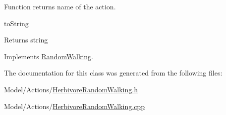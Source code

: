 Function returns name of the action. 

to\+String \begin{DoxyReturn}{Returns}
string 
\end{DoxyReturn}


Implements \hyperlink{class_random_walking_a86f089cc5cc28d179e248c67477e8b30}{Random\+Walking}.



The documentation for this class was generated from the following files\+:\begin{DoxyCompactItemize}
\item 
Model/\+Actions/\hyperlink{_herbivore_random_walking_8h}{Herbivore\+Random\+Walking.\+h}\item 
Model/\+Actions/\hyperlink{_herbivore_random_walking_8cpp}{Herbivore\+Random\+Walking.\+cpp}\end{DoxyCompactItemize}
